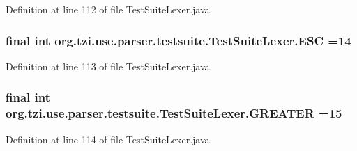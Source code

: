 Definition at line 112 of file Test\-Suite\-Lexer.\-java.

\hypertarget{classorg_1_1tzi_1_1use_1_1parser_1_1testsuite_1_1_test_suite_lexer_aedab2cd13f6e34f2bf4ba2c547b5c34a}{
\subsubsection[{E\-S\-C}]{\setlength{\rightskip}{0pt plus 5cm}final int org.\-tzi.\-use.\-parser.\-testsuite.\-Test\-Suite\-Lexer.\-E\-S\-C =14\hspace{0.3cm}{\ttfamily [static]}}}\label{classorg_1_1tzi_1_1use_1_1parser_1_1testsuite_1_1_test_suite_lexer_aedab2cd13f6e34f2bf4ba2c547b5c34a}


Definition at line 113 of file Test\-Suite\-Lexer.\-java.

\hypertarget{classorg_1_1tzi_1_1use_1_1parser_1_1testsuite_1_1_test_suite_lexer_a3254e5783a5b5c0be6c2c12cb655f654}{
\subsubsection[{G\-R\-E\-A\-T\-E\-R}]{\setlength{\rightskip}{0pt plus 5cm}final int org.\-tzi.\-use.\-parser.\-testsuite.\-Test\-Suite\-Lexer.\-G\-R\-E\-A\-T\-E\-R =15\hspace{0.3cm}{\ttfamily [static]}}}\label{classorg_1_1tzi_1_1use_1_1parser_1_1testsuite_1_1_test_suite_lexer_a3254e5783a5b5c0be6c2c12cb655f654}


Definition at line 114 of file Test\-Suite\-Lexer.\-java.

